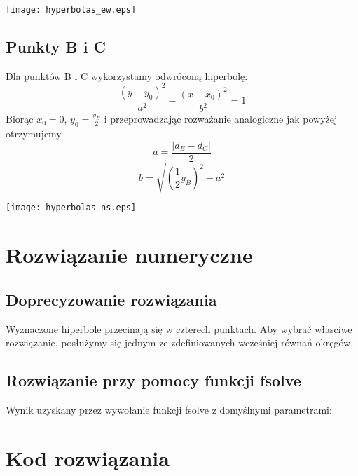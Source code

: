 \documentclass[11pt]{article}
\begin{document}
\texttt{[image: hyperbolas\_ew.eps]}

\subsection{Punkty B i C}
Dla punktów B i C wykorzystamy odwróconą hiperbolę:
\[ \frac{(y-y_0)^2}{a^2} - \frac{(x-x_0)^2}{b^2} = 1 \]
Biorąc $x_0 = 0$, $y_0 = \frac{y_B}{2}$ i przeprowadzając rozważanie analogiczne
jak powyżej otrzymujemy
\[ a = \frac{|d_B - d_C|}{2} \]
\[ b = \sqrt{\left(\frac 1 2 y_B\right)^2 - a^2} \]

\texttt{[image: hyperbolas\_ns.eps]}

\section{Rozwiązanie numeryczne}
\subsection{Doprecyzowanie rozwiązania}
Wyznaczone hiperbole przecinają się w czterech punktach.  Aby wybrać własciwe
rozwiązanie, posłużymy się jednym ze zdefiniowanych wcześniej równań okręgów.

\subsection{Rozwiązanie przy pomocy funkcji fsolve}
Wynik uzyskany przez wywołanie funkcji fsolve z domyślnymi parametrami:


\section{Kod rozwiązania}

\end{document}
